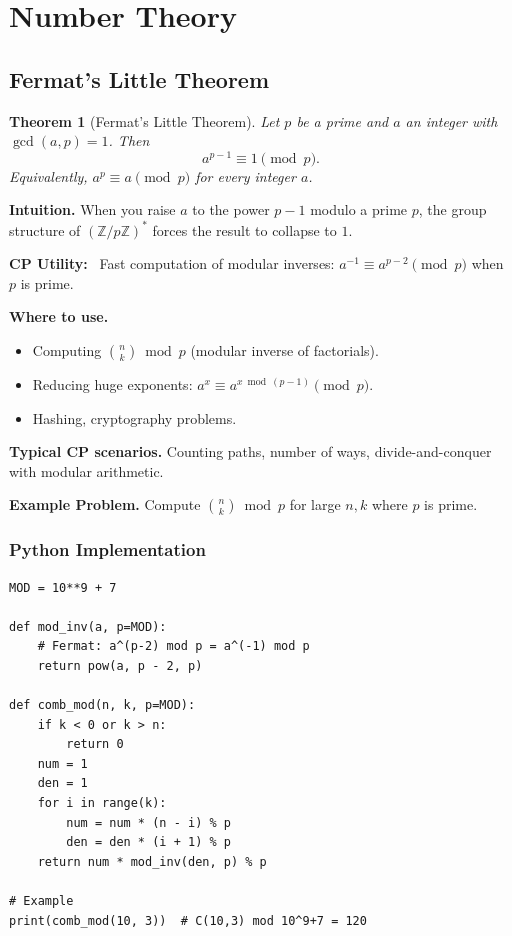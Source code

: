 \documentclass[10pt,a4paper]{article}
\theoremstyle{cpstyle}
\newtheorem{theorem}{Theorem}[section]
\newenvironment{cputility}{%
  \begin{mdframed}[backgroundcolor=theorembg, linecolor=accent!50, linewidth=1pt,
    innerleftmargin=10pt, innerrightmargin=10pt, innertopmargin=6pt, innerbottommargin=6pt]
  \textbf{\color{accent}CP Utility:}~}{%
  \end{mdframed}}
\newcommand{\Z}{\mathbb{Z}}
\begin{document}
\section{Number Theory}

\subsection{Fermat's Little Theorem}

\begin{theorem}[Fermat's Little Theorem]
Let $p$ be a prime and $a$ an integer with $\gcd(a,p)=1$. Then
\[
  a^{p-1} \equiv 1 \pmod{p}.
\]
Equivalently, $a^p \equiv a \pmod{p}$ for every integer $a$.
\end{theorem}

\textbf{Intuition.} When you raise $a$ to the power $p-1$ modulo a prime $p$, the group structure of $(\Z/p\Z)^*$ forces the result to collapse to $1$.

\begin{cputility}
Fast computation of modular inverses: $a^{-1} \equiv a^{p-2} \pmod{p}$ when $p$ is prime.
\end{cputility}

\textbf{Where to use.}
\begin{itemize}[noitemsep]
  \item Computing $\binom{n}{k} \bmod p$ (modular inverse of factorials).
  \item Reducing huge exponents: $a^x \equiv a^{x \bmod (p-1)} \pmod{p}$.
  \item Hashing, cryptography problems.
\end{itemize}

\textbf{Typical CP scenarios.} Counting paths, number of ways, divide-and-conquer with modular arithmetic.

\textbf{Example Problem.} Compute $\binom{n}{k} \bmod p$ for large $n,k$ where $p$ is prime.

\subsubsection{Python Implementation}
\begin{lstlisting}[caption={Fermat's Little Theorem -- Modular Inverse}]
MOD = 10**9 + 7

def mod_inv(a, p=MOD):
    # Fermat: a^(p-2) mod p = a^(-1) mod p
    return pow(a, p - 2, p)

def comb_mod(n, k, p=MOD):
    if k < 0 or k > n:
        return 0
    num = 1
    den = 1
    for i in range(k):
        num = num * (n - i) % p
        den = den * (i + 1) % p
    return num * mod_inv(den, p) % p

# Example
print(comb_mod(10, 3))  # C(10,3) mod 10^9+7 = 120
\end{lstlisting}
\end{document}
